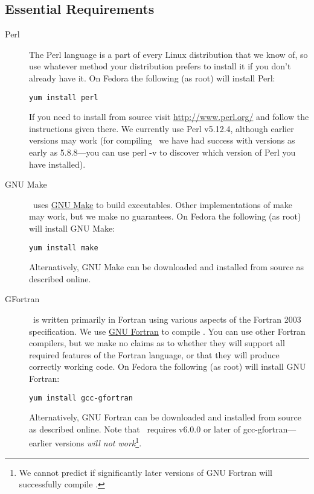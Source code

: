 \subsection{Essential Requirements}\label{sec:requirementsEssential}

\begin{description}
 \item [Perl] The Perl language is a part of every Linux distribution that we know of, so use whatever method your distribution prefers to install it if you don't already have it. On Fedora the following (as root) will install Perl:
\begin{verbatim}
yum install perl
\end{verbatim}
If you need to install from source visit \href{http://www.perl.org/}{\normalfont \ttfamily http://www.perl.org/} and follow the instructions given there. We currently use Perl v5.12.4, although earlier versions may work (for compiling \glc\ we have had success with versions as early as 5.8.8---you can use {\normalfont \ttfamily perl -v} to discover which version of Perl you have installed).

\item [GNU Make] \glc\ uses \href{http://www.gnu.org/software/make/}{GNU Make} to build executables. Other implementations of {\normalfont \ttfamily make} may work, but we make no guarantees. On Fedora the following (as root) will install GNU Make:
\begin{verbatim}
yum install make
\end{verbatim}
Alternatively, GNU Make can be downloaded and installed from source as described online.

\item [GFortran] \glc\ is written primarily in Fortran using various aspects of the Fortran 2003 specification. We use \href{http://gcc.gnu.org/fortran/}{GNU Fortran} to compile \glc. You can use other Fortran compilers, but we make no claims as to whether they will support all required features of the Fortran language, or that they will produce correctly working code. On Fedora the following (as root) will install GNU Fortran:
\begin{verbatim}
yum install gcc-gfortran
\end{verbatim}
Alternatively, GNU Fortran can be downloaded and installed from source as described online. Note that \glc\ requires v6.0.0 or later of {\normalfont \ttfamily gcc-gfortran}---earlier versions \emph{will not work}\footnote{We cannot predict if significantly later versions of GNU Fortran will successfully compile \protect\glc.}.


\end{description}
